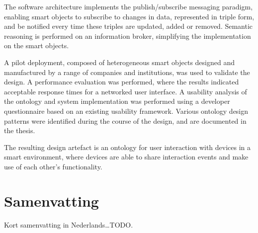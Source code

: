 The software architecture implements the publish/subscribe messaging paradigm, enabling smart objects to subscribe to changes in data, represented in triple form, and be notified every time these triples are updated, added or removed. Semantic reasoning is performed on an information broker, simplifying the implementation on the smart objects.

A pilot deployment, composed of heterogeneous smart objects designed and manufactured by a range of companies and institutions, was used to validate the design. A performance evaluation was performed, where the results indicated acceptable response times for a networked user interface. A usability analysis of the ontology and system implementation was performed using a developer questionnaire based on an existing usability framework. Various ontology design patterns were identified during the course of the design, and are documented in the thesis.

The resulting design artefact is an ontology for user interaction with devices in a smart environment, where devices are able to share interaction events and make use of each other's functionality.


\vfill

\chapter*{Samenvatting}
Kort samenvatting in Nederlands\dots TODO.


\endgroup			

\vfill